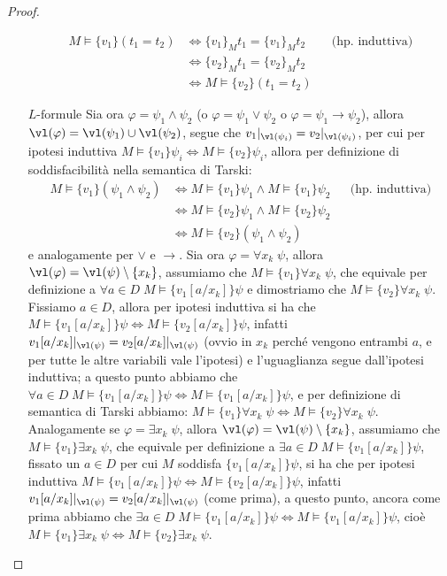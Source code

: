 \begin{proof}
\begin{itemize}
        \begin{align*}
            M \models \{v_1\} (t_1 = t_2) &\iff \{v_1\}_M t_1 = \{v_1\}_M t_2 &&\text{(hp. induttiva)} \\
            &\iff \{v_2\}_M t_1 = \{v_2\}_M t_2 \\
            &\iff M \models \{v_2\} (t_1 = t_2)
        \end{align*}
        \item [$\boxed{\text{$L$-formule}}$] Sia ora $\varphi = \psi_1 \land \psi_2$ (o $\varphi = \psi_1 \lor \psi_2$ o $\varphi = \psi_1 \to \psi_2$), allora $\vl(\varphi) = \vl(\psi_1) \cup \vl(\psi_2)$, segue che $v_1|_{\vl(\psi_i)} = v_2|_{\vl(\psi_i)}$, per cui per ipotesi induttiva $M \models \{v_1\} \psi_i \iff M \models \{v_2\} \psi_i$, allora per definizione di soddisfacibilità nella semantica di Tarski:
        \begin{align*}
            M \models \{v_1\} (\psi_1 \land \psi_2) &\iff M \models \{v_1\} \psi_1 \land M \models \{v_1\} \psi_2 &&\text{(hp. induttiva)} \\
            &\iff M \models \{v_2\} \psi_1 \land M \models \{v_2\} \psi_2 \\
            &\iff M \models \{v_2\} (\psi_1 \land \psi_2)
        \end{align*}
        e analogamente per $\lor$ e $\to$. Sia ora $\varphi = \forall x_k \; \psi$, allora $\vl(\varphi) = \vl(\psi) \setminus \{x_k\}$, assumiamo che $M \models \{v_1\} \forall x_k \; \psi$, che equivale per definizione a $\forall a \in D \; M \models \{v_1[a/x_k]\} \psi$ e dimostriamo che $M \models \{v_2\} \forall x_k \; \psi$.
        Fissiamo $a \in D$, allora per ipotesi induttiva si ha che $M \models \{v_1[a/x_k]\} \psi \iff M \models \{v_2[a/x_k]\} \psi$, infatti $v_1[a/x_k]|_{\vl(\psi)} = v_2[a/x_k]|_{\vl(\psi)}$ (ovvio in $x_k$ perché vengono entrambi $a$, e per tutte le altre variabili vale l'ipotesi) e l'uguaglianza segue dall'ipotesi induttiva; a questo punto abbiamo che $\forall a \in D \; M \models \{v_1[a/x_k]\} \psi \iff M \models \{v_1[a/x_k]\} \psi$,
        e per definizione di semantica di Tarski abbiamo: $M\models \{v_1\} \forall x_k \; \psi \iff M \models \{v_2\} \forall x_k \; \psi$.\\
        Analogamente se $\varphi = \exists x_k \; \psi$, allora $\vl(\varphi) = \vl(\psi) \setminus \{x_k\}$, assumiamo che $M \models \{v_1\} \exists x_k \; \psi$, che equivale per definizione a $\exists a \in D \; M \models \{v_1[a/x_k]\} \psi$, fissato un $a \in D$ per cui $M$ soddisfa $\{v_1[a/x_k]\} \psi$,
        si ha che per ipotesi induttiva $M \models \{v_1[a/x_k]\} \psi \iff M \models \{v_2[a/x_k]\} \psi$, infatti $v_1[a/x_k]|_{\vl(\psi)} = v_2[a/x_k]|_{\vl(\psi)}$ (come prima), a questo punto, ancora come prima abbiamo che $\exists a \in D \; M \models \{v_1[a/x_k]\} \psi \iff M \models \{v_1[a/x_k]\} \psi$, cioè $M \models \{v_1\} \exists x_k \; \psi \iff M \models \{v_2\} \exists x_k \; \psi$.
    \end{itemize}
\end{proof}

